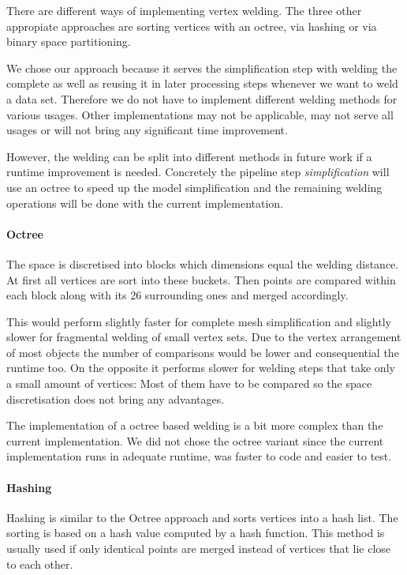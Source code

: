 \documentclass[../ClassicThesis.tex]{subfiles}
\begin{document}
There are different ways of implementing vertex welding. The three other appropiate approaches are sorting vertices with an octree, via hashing or via binary space partitioning. 

We chose our approach because it serves the simplification step with welding the complete {\threedmodel} as well as reusing it in later processing steps whenever we want to weld a data set. Therefore we do not have to implement different welding methods for various usages. Other implementations may not be applicable, may not serve all usages or will not bring any significant time improvement.

However, the welding can be split into different methods in future work if a runtime improvement is needed. Concretely the pipeline step \emph{simplification} will use an octree to speed up the model simplification and the remaining welding operations will be done with the current implementation.

\paragraph{Octree}

The space is discretised into blocks which dimensions equal the welding distance. At first all vertices are sort into these buckets. Then points are compared within each block along with its 26 surrounding ones and merged accordingly.

This would perform slightly faster for complete mesh simplification and slightly slower for fragmental welding of small vertex sets. Due to the vertex arrangement of most objects the number of comparisons would be lower and consequential the runtime too. On the opposite it performs slower for welding steps that take only a small amount of vertices: Most of them have to be compared so the space discretisation does not bring any advantages.

The implementation of a octree based welding is a bit more complex than the current implementation. We did not chose the octree variant since the current implementation runs in adequate runtime, was faster to code and easier to test. 

\paragraph{Hashing}

Hashing is similar to the Octree approach and sorts vertices into a hash list. The sorting is based on a hash value computed by a hash function. This method is usually used if only identical points are merged instead of vertices that lie close to each other. 
\end{document}
